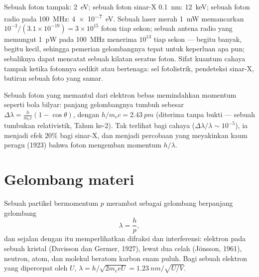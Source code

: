\begin{example}\label{ex:b1:quantum-introduction:orders}
Sebuah foton tampak: \qty{2}{eV}; sebuah foton sinar-X \qty{0.1}{nm}: \qty{12}{keV};
sebuah foton radio pada \qty{100}{MHz}: \qty{4e-7}{eV}. Sebuah laser merah \qty{1}{mW}
memancarkan $10^{-3}/(3.1 \times 10^{-19}) = 3 \times 10^{15}$ foton tiap sekon;
sebuah antena radio yang memungut \qty{1}{pW} pada \qty{100}{MHz} menerima $10^{13}$
tiap sekon --- begitu banyak, begitu kecil, sehingga pemerian gelombangnya tepat
untuk keperluan apa pun; sebaliknya  dapat mencatat sebuah kilatan
seratus foton. Sifat kuantum cahaya tampak ketika fotonnya
sedikit atau bertenaga: sel fotolistrik, pendeteksi sinar-X, butiran
sebuah foto yang samar.
\end{example}

\begin{remark}\label{rem:b1:quantum-introduction:compton}
Sebuah foton yang memantul dari elektron bebas memindahkan momentum seperti
bola bilyar: panjang gelombangnya tumbuh sebesar $\Delta\lambda = \frac{h}{m_ec}(1 -
\cos\theta)$, dengan $h/m_ec = \qty{2.43}{pm}$ (diterima tanpa bukti --- sebuah tumbukan
relativistik, Tahun ke-2). Tak terlihat bagi cahaya ($\Delta\lambda/\lambda \sim 10^{-5}$),
ia menjadi efek $20\%$ bagi sinar-X, dan menjadi percobaan yang meyakinkan
kaum peragu (1923) bahwa foton mengemban momentum $h/\lambda$.
\end{remark}

\section{Gelombang materi}

\begin{theorem}[de Broglie]\label{thm:b1:quantum-introduction:debroglie}
Sebuah partikel bermomentum $p$ merambat sebagai gelombang berpanjang gelombang
\[
\lambda = \frac{h}{p} ,
\]
dan sejalan dengan itu memperlihatkan difraksi dan interferensi: elektron pada
sebuah kristal (Davisson dan Germer, 1927), lewat dua celah (Jönsson, 1961),
neutron, atom, dan molekul beratom karbon enam puluh. Bagi sebuah elektron
yang dipercepat oleh $U$, $\lambda = h/\sqrt{2m_eeU} = \qty{1.23}{nm}/\sqrt{U/\unit{V}}$.
\end{theorem}
\admitted

